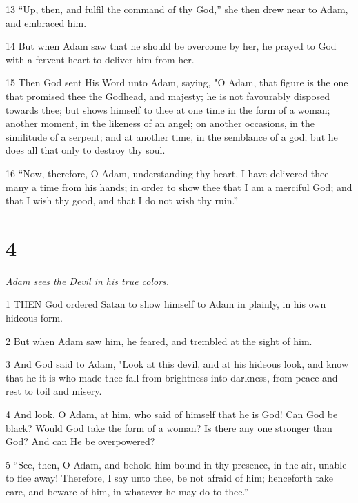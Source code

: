 \par 13 “Up, then, and fulfil the command of thy God,” she then drew near to Adam, and embraced him.

\par 14 But when Adam saw that he should be overcome by her, he prayed to God with a fervent heart to deliver him from her.

\par 15 Then God sent His Word unto Adam, saying, "O Adam, that figure is the one that promised thee the Godhead, and majesty; he is not favourably disposed towards thee; but shows himself to thee at one time in the form of a woman; another moment, in the likeness of an angel; on another occasions, in the similitude of a serpent; and at another time, in the semblance of a god; but he does all that only to destroy thy soul.

\par 16 “Now, therefore, O Adam, understanding thy heart, I have delivered thee many a time from his hands; in order to show thee that I am a merciful God; and that I wish thy good, and that I do not wish thy ruin.”

\chapter{4}

\par \textit{Adam sees the Devil in his true colors.}

\par 1 THEN God ordered Satan to show himself to Adam in plainly, in his own hideous form.

\par 2 But when Adam saw him, he feared, and trembled at the sight of him.

\par 3 And God said to Adam, "Look at this devil, and at his hideous look, and know that he it is who made thee fall from brightness into darkness, from peace and rest to toil and misery.

\par 4 And look, O Adam, at him, who said of himself that he is God! Can God be black? Would God take the form of a woman? Is there any one stronger than God? And can He be overpowered?

\par 5 “See, then, O Adam, and behold him bound in thy presence, in the air, unable to flee away! Therefore, I say unto thee, be not afraid of him; henceforth take care, and beware of him, in whatever he may do to thee.”

